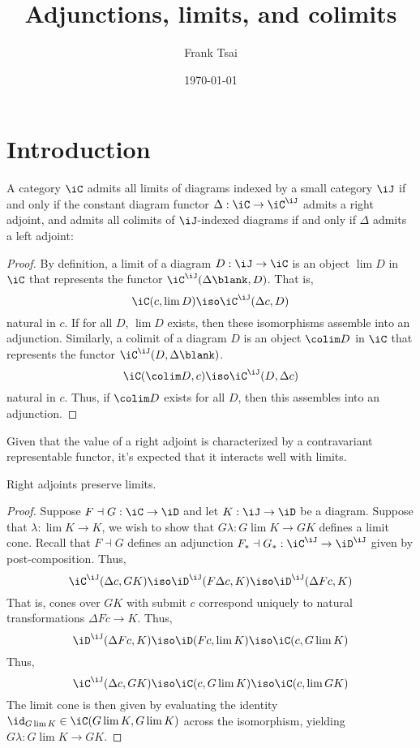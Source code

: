 \documentclass{amsart}
\title{Adjunctions, limits, and colimits}
\author{Frank Tsai}
\date{\today}
\begin{document}
\maketitle
\tableofcontents

\section{Introduction}
\label{sec:introduction}

\begin{lem}
  A category $\iC$ admits all limits of diagrams indexed by a small category $\iJ$ if and only if the constant diagram functor $\Delta : \iC \to \iC^{\iJ}$ admits a right adjoint, and admits all colimits of $\iJ$-indexed diagrams if and only if $\Delta$ admits a left adjoint:
  
\end{lem}
\begin{proof}
  By definition, a limit of a diagram $D : \iJ \to \iC$ is an object $\lim D$ in $\iC$ that represents the functor $\iC^{\iJ}(\Delta\blank,D)$.
  That is,
  \[
    \iC(c,\lim D) \iso \iC^{\iJ}(\Delta c,D)
  \]
  natural in $c$.
  If for all $D$, $\lim D$ exists, then these isomorphisms assemble into an adjunction.
  Similarly, a colimit of a diagram $D$ is an object $\colim D$ in $\iC$ that represents the functor $\iC^{\iJ}(D,\Delta\blank)$.
  \[
    \iC(\colim D, c) \iso \iC^{\iJ}(D,\Delta c)
  \]
  natural in $c$.
  Thus, if $\colim D$ exists for all $D$, then this assembles into an adjunction.
\end{proof}

Given that the value of a right adjoint is characterized by a contravariant representable functor, it's expected that it interacts well with limits.

\begin{lem}
  Right adjoints preserve limits.
\end{lem}
\begin{proof}
  Suppose $F \dashv G : \iC \to \iD$ and let $K : \iJ \to \iD$ be a diagram.
  Suppose that $\lambda : \lim K \to K$, we wish to show that $G\lambda : G\lim K \to GK$ defines a limit cone.
  Recall that $F \dashv G$ defines an adjunction $F_{*} \dashv G_{*} : \iC^{\iJ} \to \iD^{\iJ}$ given by post-composition.
  Thus,
  \[
    \iC^{\iJ}(\Delta c, GK) \iso \iD^{\iJ}(F\Delta c,K) \iso \iD^{\iJ}(\Delta F c, K)
  \]
  That is, cones over $GK$ with submit $c$ correspond uniquely to natural transformations $\Delta Fc \to K$.
  Thus,
  \[
    \iD^{\iJ}(\Delta Fc, K) \iso \iD(Fc,\lim K) \iso \iC(c,G\lim K)
  \]
  Thus,
  \[
    \iC^{\iJ}(\Delta c, GK) \iso \iC(c,G\lim K) \iso \iC(c, \lim GK)
  \]
  The limit cone is then given by evaluating the identity $\id_{G\lim K} \in \iC(G\lim K, G\lim K)$ across the isomorphism, yielding $G\lambda : G\lim K \to GK$.
\end{proof}
\end{document}
